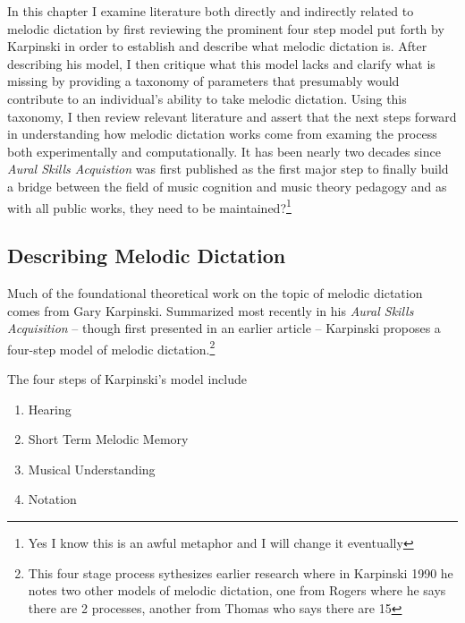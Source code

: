 \documentclass[]{book}
\providecommand{\tightlist}{%
  \setlength{\itemsep}{0pt}\setlength{\parskip}{0pt}}
\let\rmarkdownfootnote\footnote%
\def\footnote{\protect\rmarkdownfootnote}
\begin{document}
In this chapter I examine literature both directly and indirectly related to melodic dictation by first reviewing the prominent four step model put forth by Karpinski in order to establish and describe what melodic dictation is.
After describing his model, I then critique what this model lacks and clarify what is missing by providing a taxonomy of parameters that presumably would contribute to an individual's ability to take melodic dictation.
Using this taxonomy, I then review relevant literature and assert that the next steps forward in understanding how melodic dictation works come from examing the process both experimentally and computationally.
It has been nearly two decades since \emph{Aural Skills Acquistion} was first published as the first major step to finally build a bridge between the field of music cognition and music theory pedagogy \citep{davidbutlerWhyGulfMusic1997a, karpinskiAuralSkillsAcquisition2000, klonoskiPerceptualLearningHierarchy2000} and as with all public works, they need to be maintained?\footnote{Yes I know this is an awful metaphor and I will change it eventually}

\hypertarget{describing-melodic-dictation}{%
\subsection{Describing Melodic Dictation}\label{describing-melodic-dictation}}

Much of the foundational theoretical work on the topic of melodic dictation comes from Gary Karpinski.
Summarized most recently in his \emph{Aural Skills Acquisition} \citep{karpinskiAuralSkillsAcquisition2000}-- though first presented in an earlier article \citep{karpinskiModelMusicPerception1990}-- Karpinski proposes a four-step model of melodic dictation.\footnote{This four stage process sythesizes earlier research where in Karpinski 1990 he notes two other models of melodic dictation, one from Rogers where he says there are 2 processes, another from Thomas who says there are 15}

The four steps of Karpinski's model include

\begin{enumerate}
\def\labelenumi{\arabic{enumi}.}
\tightlist
\item
  Hearing
\item
  Short Term Melodic Memory
\item
  Musical Understanding
\item
  Notation
\end{enumerate}
\end{document}
